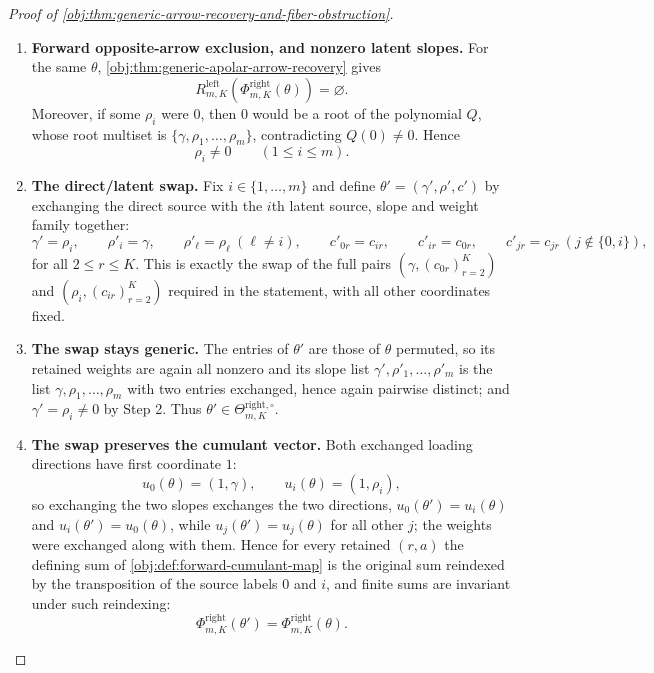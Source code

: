 \begin{proof}[Proof of \cref{obj:thm:generic-arrow-recovery-and-fiber-obstruction}]
\begin{enumerate}
\item \textbf{Forward opposite-arrow exclusion, and nonzero latent slopes.}  For the same \(\theta\), \cref{obj:thm:generic-apolar-arrow-recovery} gives
\[
R^{\mathrm{left}}_{m,K}\!\left(\Phi^{\mathrm{right}}_{m,K}(\theta)\right)=\varnothing .
\]
Moreover, if some \(\rho_i\) were \(0\), then \(0\) would be a root of the polynomial \(Q\), whose root multiset is \(\{\gamma,\rho_1,\ldots,\rho_m\}\), contradicting \(Q(0)\ne0\).  Hence
\[
\rho_i\ne0\qquad(1\le i\le m).
\]

\item \textbf{The direct/latent swap.}  Fix \(i\in\{1,\ldots,m\}\) and define \(\theta'=(\gamma',\rho',c')\) by exchanging the direct source with the \(i\)th latent source, slope and weight family together:
\[
\gamma'=\rho_i,
\qquad
\rho'_i=\gamma,
\qquad \rho'_\ell=\rho_\ell\ (\ell\ne i),
\qquad
c'_{0r}=c_{ir},
\qquad c'_{ir}=c_{0r},
\qquad c'_{jr}=c_{jr}\ (j\notin\{0,i\}),
\]
for all \(2\le r\le K\).  This is exactly the swap of the full pairs \((\gamma,(c_{0r})_{r=2}^K)\) and \((\rho_i,(c_{ir})_{r=2}^K)\) required in the statement, with all other coordinates fixed.

\item \textbf{The swap stays generic.}  The entries of \(\theta'\) are those of \(\theta\) permuted, so its retained weights are again all nonzero and its slope list \(\gamma',\rho'_1,\ldots,\rho'_m\) is the list \(\gamma,\rho_1,\ldots,\rho_m\) with two entries exchanged, hence again pairwise distinct; and \(\gamma'=\rho_i\ne0\) by Step 2.  Thus \(\theta'\in\Theta^{\mathrm{right},\circ}_{m,K}\).

\item \textbf{The swap preserves the cumulant vector.}  Both exchanged loading directions have first coordinate \(1\):
\[
u_0(\theta)=(1,\gamma),\qquad u_i(\theta)=(1,\rho_i),
\]
so exchanging the two slopes exchanges the two directions, \(u_0(\theta')=u_i(\theta)\) and \(u_i(\theta')=u_0(\theta)\), while \(u_j(\theta')=u_j(\theta)\) for all other \(j\); the weights were exchanged along with them.  Hence for every retained \((r,a)\) the defining sum of \cref{obj:def:forward-cumulant-map} is the original sum reindexed by the transposition of the source labels \(0\) and \(i\), and finite sums are invariant under such reindexing:
\[
\Phi^{\mathrm{right}}_{m,K}(\theta')=\Phi^{\mathrm{right}}_{m,K}(\theta).
\]


\end{enumerate}
\end{proof}

